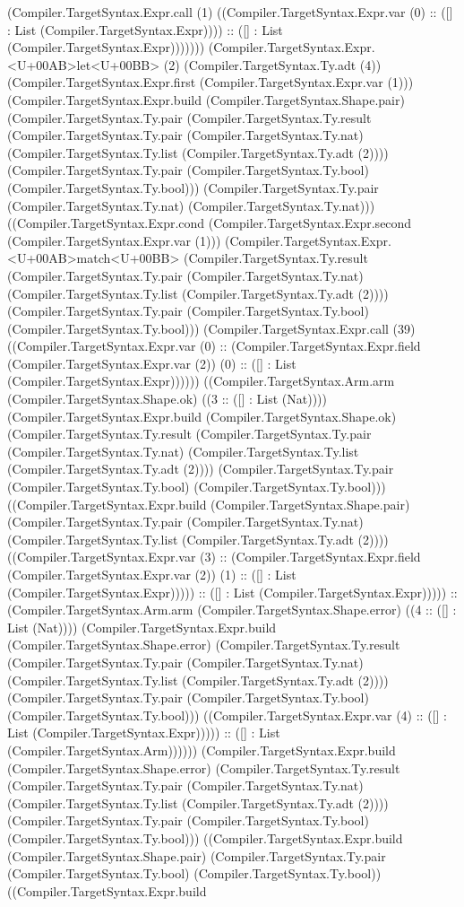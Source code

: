 \documentclass[11pt]{article}
\begin{document}
(Compiler.TargetSyntax.Expr.call (1) ((Compiler.TargetSyntax.Expr.var (0) :: ([] : List (Compiler.TargetSyntax.Expr)))) :: ([] : List (Compiler.TargetSyntax.Expr))))))) (Compiler.TargetSyntax.Expr.<U+00AB>let<U+00BB> (2) (Compiler.TargetSyntax.Ty.adt (4)) (Compiler.TargetSyntax.Expr.first (Compiler.TargetSyntax.Expr.var (1))) (Compiler.TargetSyntax.Expr.build (Compiler.TargetSyntax.Shape.pair) (Compiler.TargetSyntax.Ty.pair (Compiler.TargetSyntax.Ty.result (Compiler.TargetSyntax.Ty.pair (Compiler.TargetSyntax.Ty.nat) (Compiler.TargetSyntax.Ty.list (Compiler.TargetSyntax.Ty.adt (2)))) (Compiler.TargetSyntax.Ty.pair (Compiler.TargetSyntax.Ty.bool) (Compiler.TargetSyntax.Ty.bool))) (Compiler.TargetSyntax.Ty.pair (Compiler.TargetSyntax.Ty.nat) (Compiler.TargetSyntax.Ty.nat))) ((Compiler.TargetSyntax.Expr.cond (Compiler.TargetSyntax.Expr.second (Compiler.TargetSyntax.Expr.var (1))) (Compiler.TargetSyntax.Expr.<U+00AB>match<U+00BB> (Compiler.TargetSyntax.Ty.result (Compiler.TargetSyntax.Ty.pair (Compiler.TargetSyntax.Ty.nat) (Compiler.TargetSyntax.Ty.list (Compiler.TargetSyntax.Ty.adt (2)))) (Compiler.TargetSyntax.Ty.pair (Compiler.TargetSyntax.Ty.bool) (Compiler.TargetSyntax.Ty.bool))) (Compiler.TargetSyntax.Expr.call (39) ((Compiler.TargetSyntax.Expr.var (0) :: (Compiler.TargetSyntax.Expr.field (Compiler.TargetSyntax.Expr.var (2)) (0) :: ([] : List (Compiler.TargetSyntax.Expr)))))) ((Compiler.TargetSyntax.Arm.arm (Compiler.TargetSyntax.Shape.ok) ((3 :: ([] : List (Nat)))) (Compiler.TargetSyntax.Expr.build (Compiler.TargetSyntax.Shape.ok) (Compiler.TargetSyntax.Ty.result (Compiler.TargetSyntax.Ty.pair (Compiler.TargetSyntax.Ty.nat) (Compiler.TargetSyntax.Ty.list (Compiler.TargetSyntax.Ty.adt (2)))) (Compiler.TargetSyntax.Ty.pair (Compiler.TargetSyntax.Ty.bool) (Compiler.TargetSyntax.Ty.bool))) ((Compiler.TargetSyntax.Expr.build (Compiler.TargetSyntax.Shape.pair) (Compiler.TargetSyntax.Ty.pair (Compiler.TargetSyntax.Ty.nat) (Compiler.TargetSyntax.Ty.list (Compiler.TargetSyntax.Ty.adt (2)))) ((Compiler.TargetSyntax.Expr.var (3) :: (Compiler.TargetSyntax.Expr.field (Compiler.TargetSyntax.Expr.var (2)) (1) :: ([] : List (Compiler.TargetSyntax.Expr))))) :: ([] : List (Compiler.TargetSyntax.Expr))))) :: (Compiler.TargetSyntax.Arm.arm (Compiler.TargetSyntax.Shape.error) ((4 :: ([] : List (Nat)))) (Compiler.TargetSyntax.Expr.build (Compiler.TargetSyntax.Shape.error) (Compiler.TargetSyntax.Ty.result (Compiler.TargetSyntax.Ty.pair (Compiler.TargetSyntax.Ty.nat) (Compiler.TargetSyntax.Ty.list (Compiler.TargetSyntax.Ty.adt (2)))) (Compiler.TargetSyntax.Ty.pair (Compiler.TargetSyntax.Ty.bool) (Compiler.TargetSyntax.Ty.bool))) ((Compiler.TargetSyntax.Expr.var (4) :: ([] : List (Compiler.TargetSyntax.Expr))))) :: ([] : List (Compiler.TargetSyntax.Arm)))))) (Compiler.TargetSyntax.Expr.build (Compiler.TargetSyntax.Shape.error) (Compiler.TargetSyntax.Ty.result (Compiler.TargetSyntax.Ty.pair (Compiler.TargetSyntax.Ty.nat) (Compiler.TargetSyntax.Ty.list (Compiler.TargetSyntax.Ty.adt (2)))) (Compiler.TargetSyntax.Ty.pair (Compiler.TargetSyntax.Ty.bool) (Compiler.TargetSyntax.Ty.bool))) ((Compiler.TargetSyntax.Expr.build (Compiler.TargetSyntax.Shape.pair) (Compiler.TargetSyntax.Ty.pair (Compiler.TargetSyntax.Ty.bool) (Compiler.TargetSyntax.Ty.bool)) ((Compiler.TargetSyntax.Expr.build 
\end{document}
